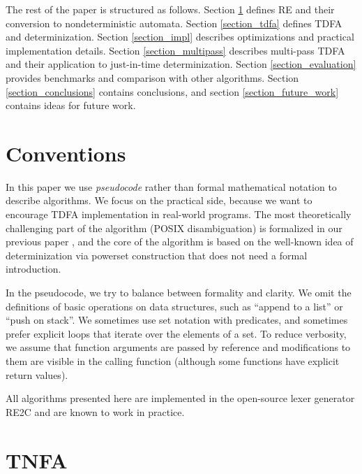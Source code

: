 \documentclass[]{article}
\begin{document}
The rest of the paper is structured as follows.
Section \ref{section_tnfa} defines RE and their conversion to nondeterministic automata.
Section \ref{section_tdfa} defines TDFA and determinization.
Section \ref{section_impl} describes optimizations and practical implementation details.
Section \ref{section_multipass} describes multi-pass TDFA and their application to just-in-time determinization.
Section \ref{section_evaluation} provides benchmarks and comparison with other algorithms.
Section \ref{section_conclusions} contains conclusions,
and section \ref{section_future_work} contains ideas for future work.

\section*{Conventions}

In this paper we use \emph{pseudocode} rather than formal mathematical notation to describe algorithms.
We focus on the practical side, because we want to encourage TDFA implementation in real-world programs.
The most theoretically challenging part of the algorithm (POSIX disambiguation)
is formalized in our previous paper \cite{BorTro19},
and the core of the algorithm is based on the well-known idea of determinization via powerset construction
that does not need a formal introduction.
\medskip

In the pseudocode, we try to balance between formality and clarity.
We omit the definitions of basic operations on data structures, such as ``append to a list'' or ``push on stack''.
We sometimes use set notation with predicates, and sometimes prefer explicit loops that iterate over the elements of a set.
To reduce verbosity, we assume that function arguments are passed by reference and modifications to them are visible in the calling function
(although some functions have explicit return values).
\medskip

All algorithms presented here are implemented in the open-source lexer generator RE2C and are known to work in practice.

\pagebreak

\section{TNFA}\label{section_tnfa}
\end{document}
